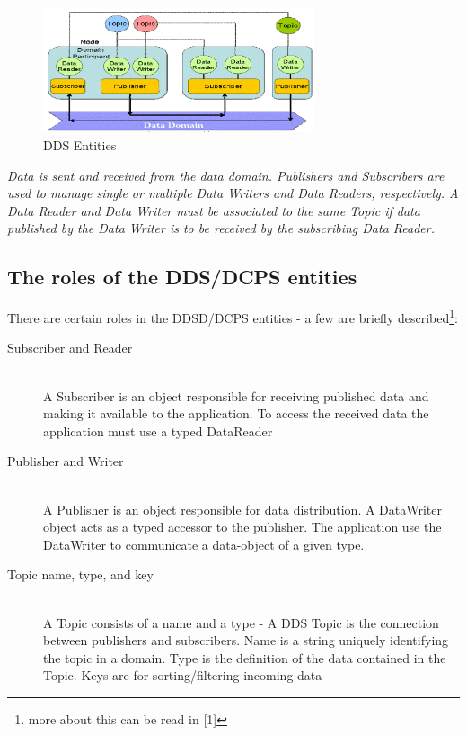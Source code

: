 \begin{figure}[ht!]
\centering
\includegraphics[width=80mm]{img/DDS_Entities.png}
\caption{DDS Entities}
\label{DDSEntities}
\end{figure}

\emph{Data is sent and received from the data domain. Publishers and Subscribers are used to manage
single or multiple Data Writers and Data Readers, respectively. A Data Reader and Data Writer
must be associated to the same Topic if data published by the Data Writer is to be received by the
subscribing Data Reader.}
	
\subsection{The roles of the DDS/DCPS entities}
There are certain roles in the DDSD/DCPS entities - a few are briefly described\footnote{more about this can be read in [1]}:

\begin{description}
\item[Subscriber and Reader] \hfill \\
A Subscriber is an object responsible for receiving published data
and making it available to the application.
To access the received data the application must use a typed DataReader

\item[Publisher and Writer] \hfill \\
A Publisher is an object responsible for data distribution.
A DataWriter object acts as a typed accessor to the publisher.
The application use the DataWriter to communicate a data-object of a given type.

\item[Topic name, type, and key] \hfill \\
A Topic consists of a name and a type - A DDS Topic is the connection between publishers and subscribers.
Name is a string uniquely identifying the topic in a domain.
Type is the definition of the data contained in the Topic.
Keys are for sorting/filtering incoming data
\end{description} 